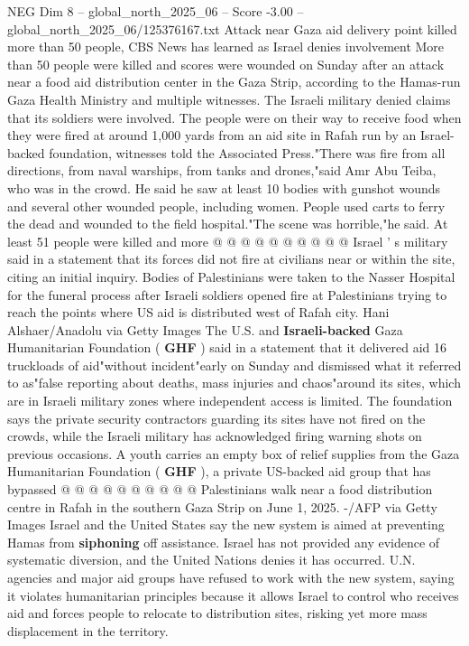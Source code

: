 \begin{textsample}{NEG Dim 8 – global\_north\_2025\_06 – Score -3.00 – global\_north\_2025\_06/125376167.txt}  \label{ex:f8_neg_024}
Attack near Gaza aid delivery point killed more than 50 people, CBS News has learned as Israel denies involvement More than 50 people were killed and scores were wounded on Sunday after an attack near a food aid distribution center in the Gaza Strip, according to the Hamas-run Gaza Health Ministry and multiple witnesses.
The Israeli military denied claims that its soldiers were involved.
The people were on their way to receive food when they were fired at around 1,000 yards from an aid site in Rafah run by an Israel-backed foundation, witnesses told the Associated Press."There was fire from all directions, from naval warships, from tanks and drones,"said Amr Abu Teiba, who was in the crowd.
He said he saw at least 10 bodies with gunshot wounds and several other wounded people, including women.
People used carts to ferry the dead and wounded to the field hospital."The scene was horrible,"he said.
At least 51 people were killed and more @ @ @ @ @ @ @ @ @ @ Israel ' s military said in a statement that its forces did not fire at civilians near or within the site, citing an initial inquiry.
Bodies of Palestinians were taken to the Nasser Hospital for the funeral process after Israeli soldiers opened fire at Palestinians trying to reach the points where US aid is distributed west of Rafah city.
Hani Alshaer/Anadolu via Getty Images The U.S. and \textbf{Israeli-backed} Gaza Humanitarian Foundation ( \textbf{GHF} ) said in a statement that it delivered aid 16 truckloads of aid"without incident"early on Sunday and dismissed what it referred to as"false reporting about deaths, mass injuries and chaos"around its sites, which are in Israeli military zones where independent access is limited.
The foundation says the private security contractors guarding its sites have not fired on the crowds, while the Israeli military has acknowledged firing warning shots on previous occasions.
A youth carries an empty box of relief supplies from the Gaza Humanitarian Foundation ( \textbf{GHF} ), a private US-backed aid group that has bypassed @ @ @ @ @ @ @ @ @ @ Palestinians walk near a food distribution centre in Rafah in the southern Gaza Strip on June 1, 2025. -/AFP via Getty Images Israel and the United States say the new system is aimed at preventing Hamas from \textbf{siphoning} off assistance.
Israel has not provided any evidence of systematic diversion, and the United Nations denies it has occurred.
U.N. agencies and major aid groups have refused to work with the new system, saying it violates humanitarian principles because it allows Israel to control who receives aid and forces people to relocate to distribution sites, risking yet more mass displacement in the territory.

\end{textsample}
